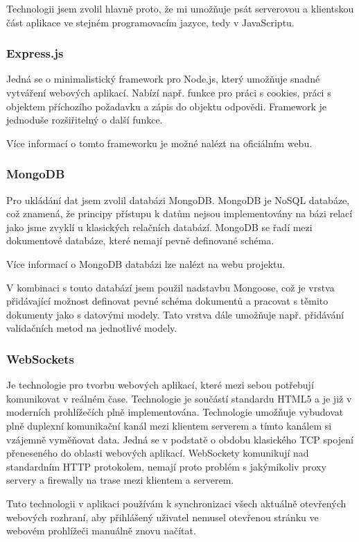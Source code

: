 \documentclass[ing,male,java,dept460,twoside]{diploma}						%
\begin{document}
Technologii jsem zvolil hlavně proto, že mi umožňuje psát serverovou a klientskou část aplikace ve stejném programovacím jazyce, tedy v JavaScriptu.

\subsubsection{Express.js}
\label{sec:ExpressJs}
Jedná se o minimalistický framework pro Node.js, který umožňuje snadné vytváření webových aplikací. Nabízí např. funkce pro práci s cookies, práci s objektem příchozího požadavku a zápis do objektu odpovědi. Framework je jednoduše rozšiřitelný o další funkce.

Více informací o tomto frameworku je možné nalézt na oficiálním webu\cite{expressjs}.

\subsubsection{MongoDB}
Pro ukládání dat jsem zvolil databázi MongoDB. MongoDB je NoSQL databáze, což znamená, že principy přístupu k datům nejsou implementovány na bázi relací jako jsme zvyklí u klasických relačních databází. MongoDB se řadí mezi dokumentové databáze, které nemají pevně definované schéma.

Více informací o MongoDB databázi lze nalézt na webu projektu\cite{mongodb}.

V kombinaci s touto databází jsem použil nadstavbu Mongoose\cite{mongoose}, což je vrstva přidávající možnost definovat pevné schéma dokumentů a pracovat s těmito dokumenty jako s datovými modely. Tato vrstva dále umožňuje např. přidávání validačních metod na jednotlivé modely.

\subsubsection{WebSockets}
\label{sec:WebSockets}
Je technologie pro tvorbu webových aplikací, které mezi sebou potřebují komunikovat v reálném čase. Technologie je součástí standardu HTML5 a je již v moderních prohlížečích plně implementována. Technologie umožňuje vybudovat plně duplexní komunikační kanál mezi klientem serverem a tímto kanálem si vzájemně vyměňovat data. Jedná se v podstatě o obdobu klasického TCP spojení přeneseného do oblasti webových aplikací. WebSockety komunikují nad standardním HTTP protokolem, nemají proto problém s jakýmikoliv proxy servery a firewally na trase mezi klientem a serverem.

Tuto technologii v aplikaci používám k synchronizaci všech aktuálně otevřených webových rozhraní, aby přihlášený uživatel nemusel otevřenou stránku ve webovém prohlížeči manuálně znovu načítat.
\end{document}
